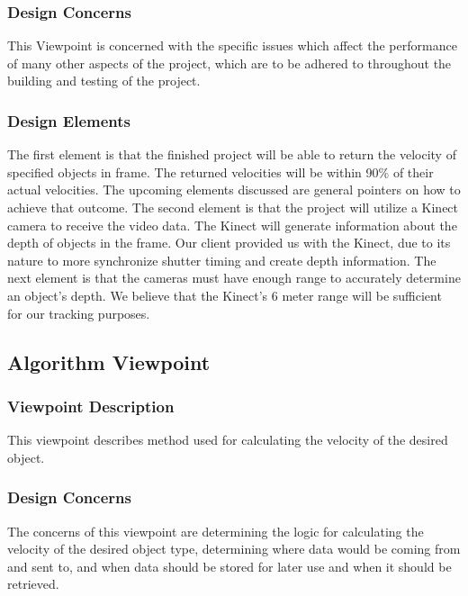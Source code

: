 \documentclass[onecolumn, draftclsnofoot,10pt, compsoc]{IEEEtran}
\begin{document}
\subsubsection{Design Concerns}
This Viewpoint is concerned with the specific issues which affect the performance of many other aspects of the project, which are to be adhered to throughout the building and testing of the project.

\subsubsection{Design Elements}
The first element is that the finished project will be able to return the velocity of specified objects in frame.
The returned velocities will be within 90\% of their actual velocities.
The upcoming elements discussed are general pointers on how to achieve that outcome.
The second element is that the project will utilize a Kinect camera to receive the video data.
The Kinect will generate information about the depth of objects in the frame.
Our client provided us with the Kinect, due to its nature to more synchronize shutter timing and create depth information.
The next element is that the cameras must have enough range to accurately determine an object's depth.
We believe that the Kinect's 6 meter range will be sufficient for our tracking purposes.


\subsection{Algorithm Viewpoint}
\subsubsection{Viewpoint Description}
This viewpoint describes method used for calculating the velocity of the desired object.

\subsubsection{Design Concerns}
The concerns of this viewpoint are determining the logic for calculating the velocity of the desired object type, determining where data would be coming from and sent to, and when data should be stored for later use and when it should be retrieved.
\end{document}
